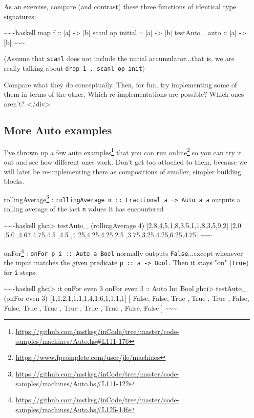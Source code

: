\documentclass[]{article}
\renewcommand{\href}[2]{#2\footnote{\url{#1}}}
\begin{document}
As an exercise, compare (and contrast) these three functions of identical type
signatures:

\textasciitilde{}\textasciitilde{}\textasciitilde{}haskell map f :: {[}a{]}
-\textgreater{} {[}b{]} scanl op initial :: {[}a{]} -\textgreater{} {[}b{]}
testAuto\_ auto :: {[}a{]} -\textgreater{} {[}b{]}
\textasciitilde{}\textasciitilde{}\textasciitilde{}

(Assume that \texttt{scanl} does not include the initial accumulator...that is,
we are really talking about \texttt{drop\ 1\ .\ scanl\ op\ init})

Compare what they do conceptually. Then, for fun, try implementing some of them
in terms of the other. Which re-implementations are possible? Which ones aren't?
\textless{}/div\textgreater{}

\subsection{More Auto examples}

\href{https://github.com/mstksg/inCode/tree/master/code-samples/machines/Auto.hs\#L111-176}{I've
thrown up a few auto examples}
\href{https://www.fpcomplete.com/user/jle/machines}{that you can run online} so
you can try it out and see how different ones work. Don't get too attached to
them, because we will later be re-implementing them as compositions of smaller,
simpler building blocks.

\href{https://github.com/mstksg/inCode/tree/master/code-samples/machines/Auto.hs\#L111-122}{rollingAverage}
: \texttt{rollingAverage\ n\ ::\ Fractional\ a\ =\textgreater{}\ Auto\ a\ a}
outputs a rolling average of the last \texttt{n} values it has encountered

\textasciitilde{}\textasciitilde{}\textasciitilde{}haskell ghci\textgreater{}
testAuto\_ (rollingAverage 4) {[}2,8,4,5,1,8,3,5,1,1,8,3,5,9,2{]} {[}2.0 ,5.0
,4.67,4.75,4.5 ,4.5 ,4.25,4.25,4.25,2.5 ,3.75,3.25,4.25,6.25,4.75{]}
\textasciitilde{}\textasciitilde{}\textasciitilde{}

\href{https://github.com/mstksg/inCode/tree/master/code-samples/machines/Auto.hs\#L125-146}{onFor}
: \texttt{onFor\ p\ i\ ::\ Auto\ a\ Bool} normally outputs
\texttt{False}...except whenever the input matches the given predicate
\texttt{p\ ::\ a\ -\textgreater{}\ Bool}. Then it stays "on" (\texttt{True}) for
\texttt{i} steps.

\textasciitilde{}\textasciitilde{}\textasciitilde{}haskell ghci\textgreater{} :t
onFor even 3 onFor even 3 :: Auto Int Bool ghci\textgreater{} testAuto\_ (onFor
even 3) {[}1,1,2,1,1,1,1,4,1,6,1,1,1,1{]} {[} False, False, True , True , True ,
False, False, True , True , True , True , True , False, False {]}
\textasciitilde{}\textasciitilde{}\textasciitilde{}
\end{document}
